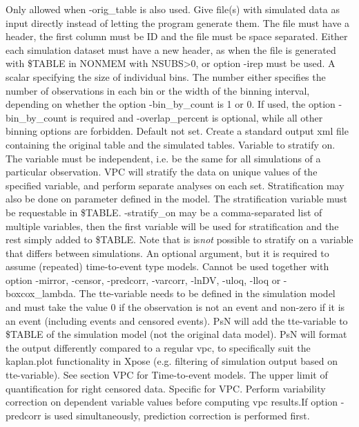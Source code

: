 \begin{optionlist}
\nextopt
{}
Only allowed when -orig\_table is also used. Give file(s) with simulated data as input directly instead of letting the program generate them.  The file must have a header, the first column must be ID and the file must be space separated. 
Either each simulation dataset must have a new header, as when the file is generated with \$TABLE in NONMEM with NSUBS>0, or option -irep must be used.
\nextopt
{}
A scalar specifying the size of individual bins. The number either specifies the number of observations in each bin or the width of the binning interval, depending on whether the option -bin\_by\_count is 1 or 0. If used, the option -bin\_by\_count is required and -overlap\_percent is optional,
while all other binning options are forbidden.
\nextopt
{}
Default not set. Create a standard output xml file containing the original table and the simulated tables.
\nextopt
{}
Variable to stratify on. The variable must be independent, i.e. be the same for all simulations of a particular observation.
VPC will stratify the data on unique values of the specified variable, and perform separate analyses on each set. Stratification 
may also be done on parameter defined in the model.
The stratification variable must be requestable in \$TABLE. -stratify\_on may be a comma-separated list of multiple variables, then the 
first variable will be used for stratification and the rest simply added to \$TABLE.
Note that is is\emph{not} possible to stratify on a variable that differs between simulations. 
\nextopt
{}
An optional argument, but it is required to assume (repeated) time-to-event type models. Cannot be used together with option -mirror, -censor, -predcorr, -varcorr,  -lnDV, -uloq, -lloq or -boxcox\_lambda. The tte-variable needs to be defined in the simulation model and must take the value 0 if the observation is not an event and non-zero if it is an event (including events and censored events). PsN will add the tte-variable to \mbox{\$TABLE} of the simulation model (not the original data model). PsN will format the output differently compared to a regular vpc, to specifically suit the kaplan.plot functionality in Xpose (e.g. filtering of simulation output based on tte-variable). See section VPC for Time-to-event models.   
\nextopt
{}
The upper limit of quantification for right censored data. Specific for VPC. 
\nextopt
{}
Perform variability correction on dependent variable values before computing vpc results.If option -predcorr is used simultaneously, prediction correction is performed first.
\nextopt
\end{optionlist}

